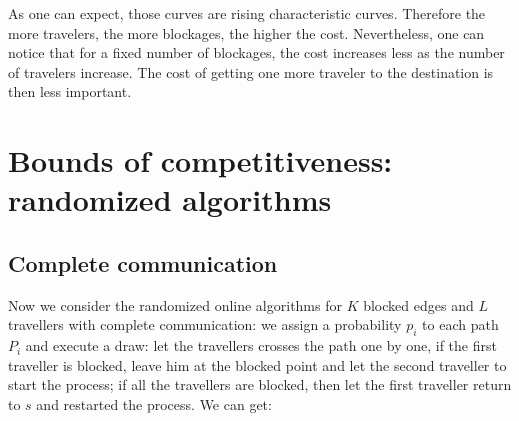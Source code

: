 \documentclass[letter-size, 11pt]{article}
\begin{document}
%

As one can expect, those curves are rising characteristic curves. Therefore the more travelers, the more blockages, the higher the cost. Nevertheless, one can notice that for a fixed number of blockages, the cost increases less as the number of travelers increase. The cost of getting one more traveler to the destination is then less important.


\section{Bounds of competitiveness: randomized algorithms}
\subsection{Complete communication}
Now we consider the randomized online algorithms for $K$ blocked edges and $L$ travellers with complete communication: we assign a probability $p_i$ to each path $P_i$ and execute a draw: let the travellers crosses the path one by one, if the first traveller is blocked, leave him at the blocked point and let the second traveller to start the process; if all the travellers are blocked, then let the first traveller return to $s$ and restarted the process. 
We can get:
\end{document}
